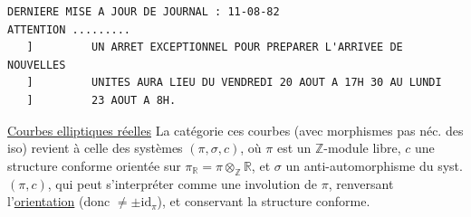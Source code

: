 {\scriptsize
\begin{verbatim}
DERNIERE MISE A JOUR DE JOURNAL : 11-08-82
ATTENTION .........
   ]         UN ARRET EXCEPTIONNEL POUR PREPARER L'ARRIVEE DE NOUVELLES
   ]         UNITES AURA LIEU DU VENDREDI 20 AOUT A 17H 30 AU LUNDI
   ]         23 AOUT A 8H.
\end{verbatim}
}

\handwritten{$x\mapsto 2x:M\to M$ injectif. \deleted{$k[\frac12$} \uline{$M$ plat sur $k$} donc $x\mapsto 2x$ $M\to M$ injectif}

\handwritten{\deleted{\[
\begin{aligned}
&\deleted{\unsure{k'=k\hookrightarrow}}\ k'=k[\tfrac12]\\
&M\subset M\otimes k'=M'=M'_+\oplus M'_-=\deleted{M_+ k'}\\
&M_+=\{m\in M\mid\sigma x=\unsure{x|+}\}=\operatorname{Ker}(1-\sigma)\\
&M_-=\{m\in M\mid\sigma x=-x\}=\operatorname{Ker}(1+\sigma)
\end{aligned}
\]}}

\handwritten{\[
\begin{aligned}M_+\cap M_-&=0\\
M/M_++M_-&\quad\text{annulé par }2\\
2x&=(\underbrace{x+\sigma x}_{\in M_+})+(\underbrace{m-\sigma x}_{\in M_-})
\end{aligned}
\]}


\handwritten{\[
\begin{aligned}
&\deleted{P\ Q}\quad P,Q\qquad M\\
&m\in P/2P\oplus Q/2Q\\
&(1+\sigma)M'=2M_+\qquad(1\deleted{\unsure{+}}-\sigma)M'=2M_-
\end{aligned}
\]}


\uline{Courbes elliptiques réelles}  La catégorie  ces courbes (avec morphismes pas néc. des iso) revient à celle des  systèmes $(\pi,\sigma,c)$, où $\pi$ est un $\mathbb Z$-module libre,   $c$ une structure  conforme orientée sur $\pi_{\mathbb R}=\pi\otimes_{\mathbb Z}\mathbb R$, et $\sigma$ un anti-automorphisme du syst. $(\pi,c)$, qui peut s'interpréter comme une involution de $\pi$, renversant l'\uline{orientation}  (donc $\ne\pm\mathrm{id}_\pi$), et conservant la structure conforme.

